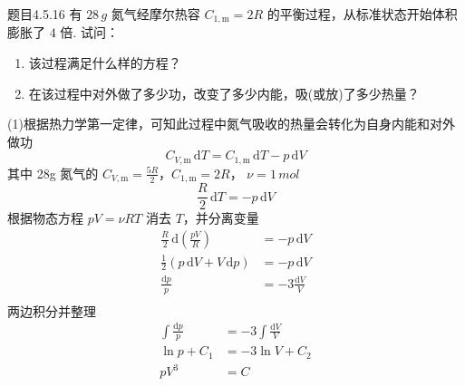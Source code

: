 \begin{question}{题目4.5.16}
    有 $28 \,\si{g}$ 氮气经摩尔热容 $C_{1,\mathrm{m}} = 2R$ 的平衡过程，从标准状态开始体积膨胀了 $4$ 倍. 试问：
    \begin{enumerate}
        \item[(1)] 该过程满足什么样的方程？
        \item[(2)] 在该过程中对外做了多少功，改变了多少内能，吸(或放)了多少热量？
    \end{enumerate}
\end{question}
\begin{solution}
    (1)根据热力学第一定律，可知此过程中氮气吸收的热量会转化为自身内能和对外做功
    $$
        C_{V,\mathrm{m}} \,\mathrm{d}T = C_{1,\mathrm{m}} \,\mathrm{d}T - p \,\mathrm{d}V
    $$
    其中 28g 氮气的 $C_{V,\mathrm{m}} = \frac{5R}{2}$，$C_{1,\mathrm{m}} = 2R$， $\nu = 1 \,\si{mol}$
    $$
        \frac{R}{2} \,\mathrm{d}T = -p \,\mathrm{d}V
    $$
    根据物态方程 $pV = \nu RT$ 消去 $T$，并分离变量
    $$
        \begin{aligned}
            \frac{R}{2} \,\mathrm{d}\left(\frac{pV}{R}\right)      & = -p \,\mathrm{d}V         \\
            \frac{1}{2} \left(p\,\mathrm{d}V + V\,\mathrm{d}p\right) & = -p \,\mathrm{d}V         \\
            \frac{\mathrm{d}p}{p}                                  & = -3 \frac{\mathrm{d}V}{V} \\
        \end{aligned}
    $$
    两边积分并整理
    $$
        \begin{aligned}
            \int\frac{\mathrm{d}p}{p} & = -3 \int\frac{\mathrm{d}V}{V} \\
            \ln{p} + C_1              & = -3\ln{V} + C_2               \\
            pV^3                      & = C
        \end{aligned}
    $$

\end{solution}
